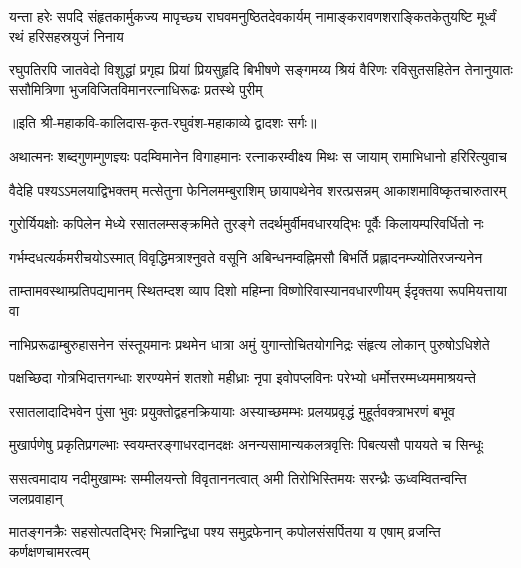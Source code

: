 \fourlineindentedshloka
{यन्ता हरेः सपदि संहृतकार्मुकज्य}
{मापृच्छ्य राघवमनुष्ठितदेवकार्यम्}
{नामाङ्करावणशराङ्कितकेतुयष्टि}
{मूर्ध्वं रथं हरिसहस्रयुजं निनाय} %

\fourlineindentedshloka
{रघुपतिरपि जातवेदो विशुद्धां प्रगृह्य प्रियां}
{प्रियसुहृदि बिभीषणे सङ्गमय्य श्रियं वैरिणः}
{रविसुतसहितेन तेनानुयातः ससौमित्रिणा}
{भुजविजितविमानरत्नाधिरूढः प्रतस्थे पुरीम्} %

॥इति श्री-महाकवि-कालिदास-कृत-रघुवंश-महाकाव्ये द्वादशः सर्गः॥

\fourlineindentedshloka
{अथात्मनः शब्दगुणम्गुणज्ञ्यः}
{पदम्विमानेन विगाहमानः}
{रत्नाकरम्वीक्ष्य मिथः स जायाम्}
{रामाभिधानो हरिरित्युवाच} %

\fourlineindentedshloka
{वैदेहि पश्यऽऽमलयाद्विभक्तम्}
{मत्सेतुना फेनिलमम्बुराशिम्}
{छायापथेनेव शरत्प्रसन्नम्}
{आकाशमाविष्कृतचारुतारम्} %

\fourlineindentedshloka
{गुरोर्यियक्षोः कपिलेन मेध्ये}
{रसातलम्सङ्क्रमिते तुरङ्गे}
{तदर्थमुर्वीमवधारयद्भिः}
{पूर्वैः किलायम्परिवर्धितो नः} %

\fourlineindentedshloka
{गर्भम्दधत्यर्कमरीचयोऽस्मात्}
{विवृद्धिमत्राश्नुवते वसूनि}
{अबिन्धनम्वह्निमसौ बिभर्ति}
{प्रह्लादनम्ज्योतिरजन्यनेन} %

\fourlineindentedshloka
{ताम्तामवस्थाम्प्रतिपद्यमानम्}
{स्थितम्दश व्याप दिशो महिम्ना}
{विष्णोरिवास्यानवधारणीयम्}
{ईदृक्तया रूपमियत्ताया वा} %

\fourlineindentedshloka
{नाभिप्ररूढाम्बुरुहासनेन}
{संस्तूयमानः प्रथमेन धात्रा}
{अमुं युगान्तोचितयोगनिद्रः}
{संहृत्य लोकान् पुरुषोऽधिशेते} %

\fourlineindentedshloka
{पक्षच्छिदा गोत्रभिदात्तगन्धाः}
{शरण्यमेनं शतशो महीध्राः}
{नृपा इवोपप्लविनः परेभ्यो}
{धर्मोत्तरम्मध्यममाश्रयन्ते} %

\fourlineindentedshloka
{रसातलादादिभवेन पुंसा}
{भुवः प्रयुक्तोद्वहनक्रियायाः}
{अस्याच्छमम्भः प्रलयप्रवृद्धं}
{मुहूर्तवक्त्राभरणं बभूव} %

\fourlineindentedshloka
{मुखार्पणेषु प्रकृतिप्रगल्भाः}
{स्वयम्तरङ्गाधरदानदक्षः}
{अनन्यसामान्यकलत्रवृत्तिः}
{पिबत्यसौ पाययते च सिन्धूः} %

\fourlineindentedshloka
{ससत्वमादाय नदीमुखाम्भः}
{सम्मीलयन्तो विवृताननत्वात्}
{अमी तिरोभिस्तिमयः सरन्ध्रैः}
{ऊध्वम्वितन्वन्ति जलप्रवाहान्} %

\fourlineindentedshloka
{मातङ्गनक्रैः सहसोत्पतद्भिर्ः}
{भिन्नान्द्विधा पश्य समुद्रफेनान्}
{कपोलसंसर्पितया य एषाम्}
{व्रजन्ति कर्णक्षणचामरत्वम्} %

